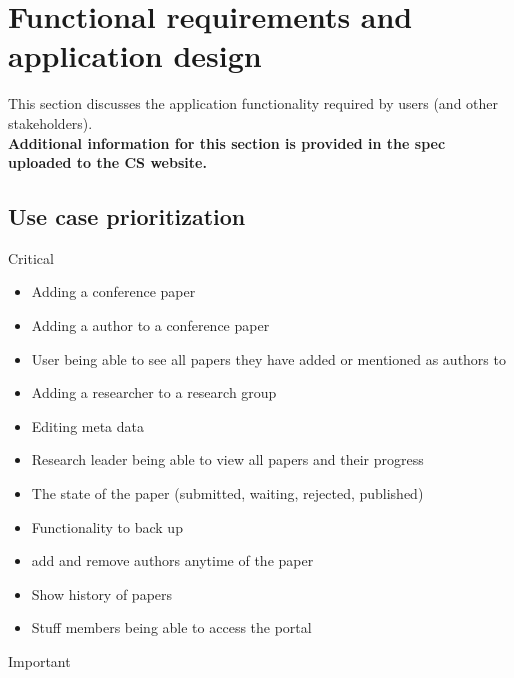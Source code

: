 \documentclass[a4paper,12pt]{article}
\begin{document}
\section{Functional requirements and application design}
This section discusses the application functionality required by users (and other stakeholders).\\
\textbf{Additional information for this section is provided in the spec uploaded to the CS website.}

\subsection{Use case prioritization}
Critical
\begin{itemize}
\item Adding a conference paper
\item Adding a author to a conference paper
\item User being able to see all papers they have added or mentioned as authors to
\item Adding a researcher to a research group
\item Editing meta data 
\item Research leader being able to view all papers and their progress
\item The state of the paper (submitted, waiting, rejected, published)
\item Functionality to back up 
\item add and remove authors anytime of the paper
\item Show history of papers
\item Stuff members being able to access the portal

\end{itemize}
Important
\end{document}
